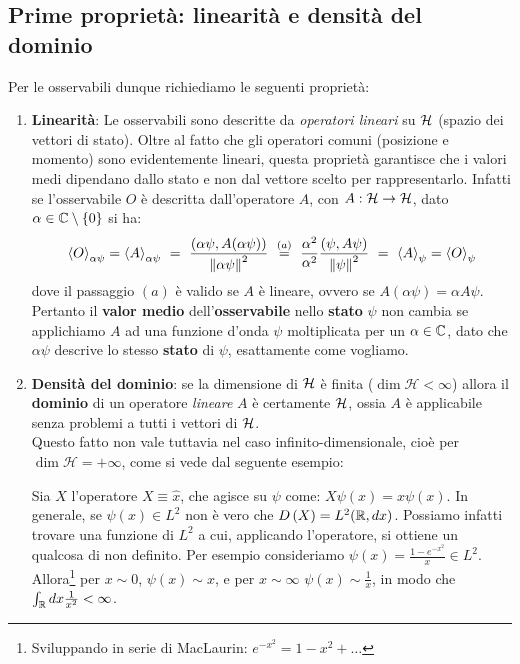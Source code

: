 \documentclass[FisicaTeorica.tex]{subfiles}
\begin{document}
\subsection{Prime proprietà: linearità e densità del dominio}
Per le osservabili dunque richiediamo le seguenti proprietà:
\begin{enumerate}
    \item \textbf{Linearità}: Le osservabili sono descritte da \emph{operatori lineari} su $\mathcal{H}$ (spazio dei vettori di stato).
    Oltre al fatto che gli operatori comuni (posizione e momento) sono evidentemente lineari, questa proprietà garantisce che i valori medi dipendano dallo stato e non dal vettore scelto per rappresentarlo. Infatti se l'osservabile $O$ è descritta dall'operatore $A$, con $A:\mathcal{H} \to \mathcal{H}$, dato $\alpha \in \mathbb{C}\setminus \{0\}$ si ha: 
    \[
    \avg{O}_{\alpha \psi} = \avg{A}_{\alpha \psi}  \ = \ \frac{(\alpha\psi,A(\alpha\psi))}{\norm{\alpha\psi}^2} \ \overset{(a)}{=} \ \frac{\alpha^2}{\alpha^2} \frac{(\psi,A\psi)}{\norm{\psi}^2} \ = \ \avg{A}_\psi = \avg{O}_\psi
    \]
    dove il passaggio $(a)$ è valido se $A$ è lineare, ovvero se $A(\alpha \psi) = \alpha A\psi$. 
    Pertanto il \textbf{valor medio} dell'\textbf{osservabile} nello \textbf{stato} $\psi$ non cambia se applichiamo $A$ ad una funzione d'onda $\psi$ moltiplicata per un $\alpha \in \mathbb{C}$, dato che $\alpha\psi$ descrive lo stesso \textbf{stato} di $\psi$, esattamente come vogliamo.
	\item \textbf{Densità del dominio}:  se la dimensione di $\mathcal{H}$ è finita ($\dim{\mathcal{H}<\infty}$) allora il \textbf{dominio} di un operatore \textit{lineare} $A$ è certamente $\mathcal{H}$, ossia $A$ è applicabile senza problemi a tutti i vettori di $\mathcal{H}$.\\
	Questo fatto non vale tuttavia nel caso infinito-dimensionale, cioè per $\dim{\mathcal{H}=+\infty}$, come si vede dal seguente esempio:
	\begin{es} Sia $X$ l'operatore  $X\equiv \hat{x}$, che agisce su $\psi$ come: $X\psi \left(x\right)=x\psi \left(x\right)$.
	In generale, se $\psi \left(x\right)\in L^2$ non è vero che $D\left(X\right)=L^2(\mathbb{R}, dx)$.
	Possiamo infatti trovare una funzione di $L^2$ a cui, applicando l'operatore, si ottiene un qualcosa di non definito. Per esempio consideriamo $\psi \left(x\right)=\frac{1-e^{-x^2}}{x}\in L^2$. Allora\footnote{Sviluppando in serie di MacLaurin: $e^{-x^2} = 1 - x^2 + \dots$} per $x\sim 0$, $\psi \left(x\right)\sim x$, e per $x\sim \infty$  $\psi \left(x\right)\sim \frac{1}{x}$, in modo che $\int_{\mathbb{R}} dx \frac{1}{x^2}<\infty$.

\end{es}
\end{enumerate}
\end{document}
